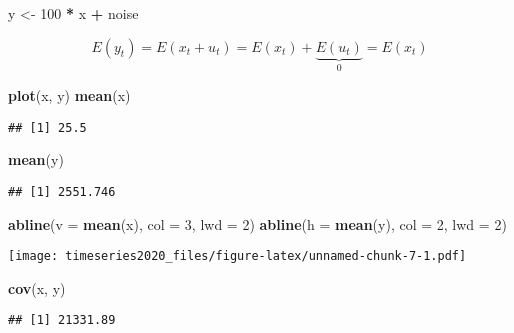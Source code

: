 \documentclass[
]{book}
\newenvironment{Shaded}{\begin{snugshade}}{\end{snugshade}}
\newcommand{\DataTypeTok}[1]{\textcolor[rgb]{0.13,0.29,0.53}{#1}}
\newcommand{\DecValTok}[1]{\textcolor[rgb]{0.00,0.00,0.81}{#1}}
\newcommand{\KeywordTok}[1]{\textcolor[rgb]{0.13,0.29,0.53}{\textbf{#1}}}
\newcommand{\NormalTok}[1]{#1}
\newcommand{\OperatorTok}[1]{\textcolor[rgb]{0.81,0.36,0.00}{\textbf{#1}}}
\newcommand{\StringTok}[1]{\textcolor[rgb]{0.31,0.60,0.02}{#1}}
\begin{document}
\begin{Shaded}
\begin{Highlighting}[]
\NormalTok{y <-}\StringTok{ }\DecValTok{100} \OperatorTok{*}\StringTok{ }\NormalTok{x }\OperatorTok{+}\StringTok{ }\NormalTok{noise}
\end{Highlighting}
\end{Shaded}

\[
E(y_t) = E(x_t + u_t) = E(x_{t}) + \underbrace{E(u_{t})}_{0} = E(x_t)
\]

\begin{Shaded}
\begin{Highlighting}[]
\KeywordTok{plot}\NormalTok{(x, y)}
\KeywordTok{mean}\NormalTok{(x)}
\end{Highlighting}
\end{Shaded}

\begin{verbatim}
## [1] 25.5
\end{verbatim}

\begin{Shaded}
\begin{Highlighting}[]
\KeywordTok{mean}\NormalTok{(y)}
\end{Highlighting}
\end{Shaded}

\begin{verbatim}
## [1] 2551.746
\end{verbatim}

\begin{Shaded}
\begin{Highlighting}[]
\KeywordTok{abline}\NormalTok{(}\DataTypeTok{v =} \KeywordTok{mean}\NormalTok{(x), }\DataTypeTok{col =} \DecValTok{3}\NormalTok{, }\DataTypeTok{lwd =} \DecValTok{2}\NormalTok{)}
\KeywordTok{abline}\NormalTok{(}\DataTypeTok{h =} \KeywordTok{mean}\NormalTok{(y), }\DataTypeTok{col =} \DecValTok{2}\NormalTok{, }\DataTypeTok{lwd =} \DecValTok{2}\NormalTok{)}
\end{Highlighting}
\end{Shaded}

\texttt{[image: timeseries2020\_files/figure-latex/unnamed-chunk-7-1.pdf]}

\begin{Shaded}
\begin{Highlighting}[]
\KeywordTok{cov}\NormalTok{(x, y)}
\end{Highlighting}
\end{Shaded}

\begin{verbatim}
## [1] 21331.89
\end{verbatim}
\end{document}
